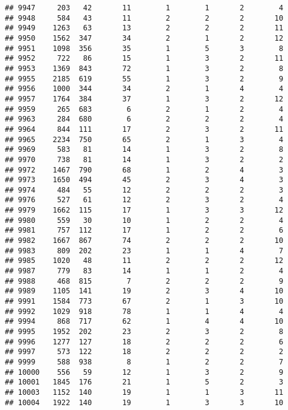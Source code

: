 \documentclass[]{article}
\begin{document}
\begin{verbatim}
## 9947     203   42       11        1        1       2        4
## 9948     584   43       11        2        2       2       10
## 9949    1263   63       13        2        2       2       11
## 9950    1562  347       34        2        1       2       12
## 9951    1098  356       35        1        5       3        8
## 9952     722   86       15        1        3       2       11
## 9953    1369  843       72        1        3       2        8
## 9955    2185  619       55        1        3       2        9
## 9956    1000  344       34        2        1       4        4
## 9957    1764  384       37        1        3       2       12
## 9959     265  683        6        2        1       2        4
## 9963     284  680        6        2        2       2        4
## 9964     844  111       17        2        3       2       11
## 9965    2234  750       65        2        1       3        4
## 9969     583   81       14        1        3       2        8
## 9970     738   81       14        1        3       2        2
## 9972    1467  790       68        1        2       4        3
## 9973    1650  494       45        2        3       4        3
## 9974     484   55       12        2        2       2        3
## 9976     527   61       12        2        3       2        4
## 9979    1662  115       17        1        3       3       12
## 9980     559   30       10        1        2       2        4
## 9981     757  112       17        1        2       2        6
## 9982    1667  867       74        2        2       2       10
## 9983     809  202       23        1        1       4        7
## 9985    1020   48       11        2        2       2       12
## 9987     779   83       14        1        1       2        4
## 9988     468  815        7        2        2       2        9
## 9989    1105  141       19        2        3       4       10
## 9991    1584  773       67        2        1       3       10
## 9992    1029  918       78        1        1       4        4
## 9994     868  717       62        1        4       4       10
## 9995    1952  202       23        2        3       2        8
## 9996    1277  127       18        2        2       2        6
## 9997     573  122       18        2        2       2        2
## 9999     588  938        8        1        2       2        7
## 10000    556   59       12        1        3       2        9
## 10001   1845  176       21        1        5       2        3
## 10003   1152  140       19        1        1       3       11
## 10004   1922  140       19        1        3       3       10

\end{verbatim}
\end{document}
